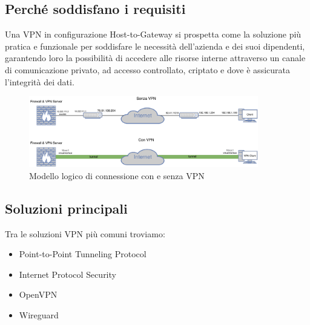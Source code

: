 \subsection{Perché soddisfano i requisiti}
Una VPN in configurazione Host-to-Gateway si prospetta come la soluzione più pratica e funzionale per soddisfare le necessità dell'azienda e dei suoi dipendenti, garantendo loro la possibilità di accedere alle risorse interne attraverso un canale di comunicazione privato, ad accesso controllato, criptato e dove è assicurata l'integrità dei dati.

\begin{figure}[ht]
    \centering
    \includegraphics[width=10cm]{figure/vpn_noVPN.pdf}
    \caption{Modello logico di connessione con e senza VPN}
\end{figure}

\subsection{Soluzioni principali}
Tra le soluzioni VPN più comuni troviamo:
\begin{itemize}
    \item Point-to-Point Tunneling Protocol
    \item Internet Protocol Security
    \item OpenVPN
    \item Wireguard
\end{itemize}




